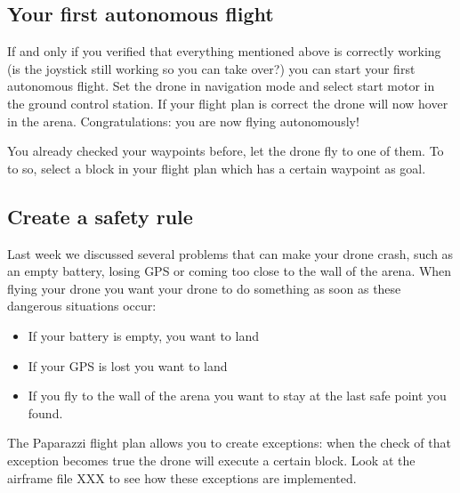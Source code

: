 \documentclass{article}
\begin{document}
\subsection*{Your first autonomous flight}
If and only if you verified that everything mentioned above is correctly working (is the joystick still working so you can take over?) you can start your first autonomous flight. 
Set the drone in navigation mode and select start motor in the ground control station. If your flight plan is correct the drone will now hover in the arena. Congratulations: you are now flying autonomously!

You already checked your waypoints before, let the drone fly to one of them. To to so, select a block in your flight plan which has a certain waypoint as goal. 


\subsection*{Create a safety rule}
Last week we discussed several problems that can make your drone crash, such as an empty battery, losing GPS or coming too close to the wall of the arena.
When flying your drone you want your drone to do something as soon as these dangerous situations occur:
\begin{itemize}
\item If your battery is empty, you want to land
\item If your GPS is lost you want to land
\item If you fly to the wall of the arena you want to stay at the last safe point you found. 
\end{itemize}
The Paparazzi flight plan allows you to create exceptions: when the check of that exception becomes true the drone will execute a certain block. Look at the airframe file XXX to see how these exceptions are implemented. 
\end{document}
